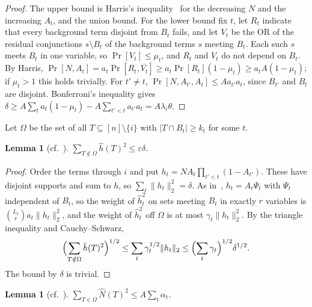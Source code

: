 \documentclass[11pt]{amsart}
\newtheorem{lemma}[theorem]{Lemma}
\theoremstyle{remark}
\begin{document}
\begin{proof}
The upper bound is Harris's inequality~\cite{Harris} for the decreasing $N$ and the increasing $A_t$, and the union bound. For the
lower bound fix $t$, let $R_t$ indicate that every background term disjoint from $B_t$ fails, and let $V_t$ be the OR
of the residual conjunctions $s\setminus B_t$ of the background terms $s$ meeting $B_t$. Each such $s$ meets $B_t$ in one
variable, so $\Pr[V_t]\le\mu_t$, and $R_t$ and $V_t$ do not depend on $B_t$. By Harris,
$\Pr[N,A_t]=a_t\Pr[R_t,\overline{V_t}]\ge a_t\Pr[R_t](1-\mu_t)\ge a_tA(1-\mu_t)$; if $\mu_t>1$ this holds
trivially. For $t'\ne t$, $\Pr[N,A_{t'},A_t]\le Aa_{t'}a_t$, since $B_{t'}$ and $B_t$ are disjoint. Bonferroni's inequality gives
$\delta\ge A\sum_ta_t(1-\mu_t)-A\sum_{t'<t}a_{t'}a_t=A{\lambda_i}\theta$.
\end{proof}

Let $\Omega$ be the set of all $T\subseteq[n]\setminus\{i\}$ with $|T\cap B_t|\ge k_t$ for some $t$.

\begin{lemma}[{cf.~\cite[Lemma~4]{Shm6}}]\label{lem:m2}
$\sum_{T\notin\Omega}\hat h(T)^2\le\varepsilon\delta$.
\end{lemma}

\begin{proof}
Order the terms through $i$ and put $h_t=NA_t\prod_{t'<t}(1-A_{t'})$. These have disjoint supports and sum to $h$, so
$\sum_t\|h_t\|_2^2=\delta$. As in~\cite[Lemma~4]{Shm6}, $h_t=A_t\Psi_t$ with $\Psi_t$ independent of $B_t$, so the
weight of $\hat h_t^2$ on sets meeting $B_t$ in exactly $r$ variables is $\binom{L_t}ra_t\|h_t\|_2^2$, and the weight
of $\hat h_t^2$ off $\Omega$ is at most $\gamma_t\|h_t\|_2^2$. By the triangle inequality and Cauchy--Schwarz,
\[
\Bigl(\sum_{T\notin\Omega}\hat h(T)^2\Bigr)^{1/2}\le\sum_t\gamma_t^{1/2}\|h_t\|_2\le\Bigl(\sum_t\gamma_t\Bigr)^{1/2}\delta^{1/2}.
\]
The bound by $\delta$ is trivial.
\end{proof}

\begin{lemma}[{cf.~\cite[Lemma~5]{Shm6}}]\label{lem:m3}
$\sum_{T\in\Omega}\hat N(T)^2\le A\sum_t\alpha_t$.
\end{lemma}
\end{document}
